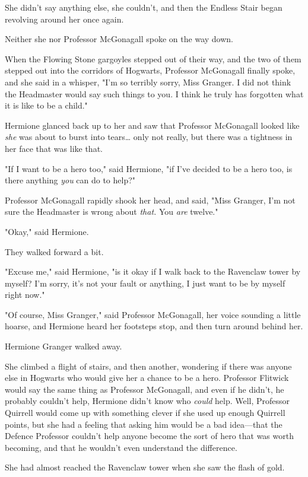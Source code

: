 She didn't say anything else, she couldn't, and then the Endless Stair began
revolving around her once again.

Neither she nor Professor McGonagall spoke on the way down.

When the Flowing Stone gargoyles stepped out of their way, and the two of them
stepped out into the corridors of Hogwarts, Professor McGonagall finally spoke,
and she said in a whisper, "I'm so terribly sorry, Miss Granger. I did not
think the Headmaster would say such things to you. I think he truly has
forgotten what it is like to be a child."

Hermione glanced back up to her and saw that Professor McGonagall looked like
\emph{she} was about to burst into tears{\ldots} only not really, but there was
a tightness in her face that was like that.

"If I want to be a hero too," said Hermione, "if I've decided to be a hero too,
is there anything \emph{you} can do to help?"

Professor McGonagall rapidly shook her head, and said, "Miss Granger, I'm not
sure the Headmaster is wrong about \emph{that.} You \emph{are} twelve."

"Okay," said Hermione.

They walked forward a bit.

"Excuse me," said Hermione, "is it okay if I walk back to the Ravenclaw tower
by myself? I'm sorry, it's not your fault or anything, I just want to be by
myself right now."

"Of course, Miss Granger," said Professor McGonagall, her voice sounding a
little hoarse, and Hermione heard her footsteps stop, and then turn around
behind her.

Hermione Granger walked away.

She climbed a flight of stairs, and then another, wondering if there was anyone
else in Hogwarts who would give her a chance to be a hero. Professor Flitwick
would say the same thing as Professor McGonagall, and even if he didn't, he
probably couldn't help, Hermione didn't know who \emph{could} help. Well,
Professor Quirrell would come up with something clever if she used up enough
Quirrell points, but she had a feeling that asking him would be a bad
idea---that the Defence Professor couldn't help anyone become the sort of hero
that was worth becoming, and that he wouldn't even understand the difference.

She had almost reached the Ravenclaw tower when she saw the flash of gold.
